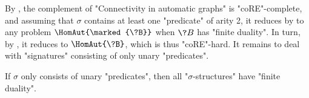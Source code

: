 By , the complement of "Connectivity in automatic graphs"
is "coRE"-complete, and assuming that $\sigma$ contains at least one "predicate" of arity 2,
it reduces by  to any problem $\HomAut{\marked{\?B}}$ when $\?B$ has "finite duality". In turn, by , it reduces to
$\HomAut{\?B}$, which is thus "coRE"-hard. It remains to deal with "signatures" consisting of only
unary "predicates".

\begin{property}
	\AP\label{prop:finite-duality-unary-predicates}
	If $\sigma$ only consists of unary "predicates", then all "$\sigma$-structures"
	have "finite duality".
\end{property}	

